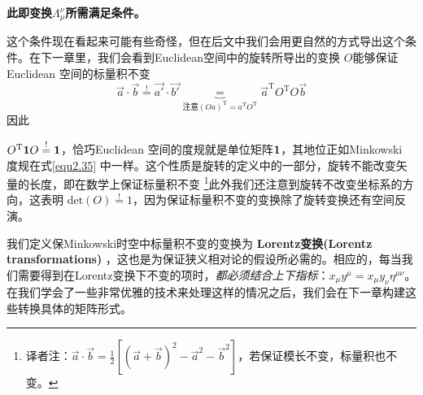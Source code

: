 {\bf{此即变换$\Lambda_\mu^\nu$所需满足条件。}}

这个条件现在看起来可能有些奇怪，但在后文中我们会用更自然的方式导出这个条件。在下一章里，我们会看到Euclidean空间中的旋转所导出的变换%
$O$能够保证Euclidean 空间的标量积不变%
\begin{equation}\label{equ2.36}
  \vec{a} \cdot \vec{b}
  \overset{\text{!}}{=}
  \vec{a'} \cdot \vec{b'}
  \!\!\!\!\!\!\!\!\!\!
  \underbrace{=}_{\text{注意}
  (Oa)^\mathrm{T}=a^\mathrm{T}O^\mathrm{T}}
  \!\!\!\!\!\!\!\!\!\!
  \vec{a}^\mathrm{T} O^\mathrm{T} O\vec{b}
\end{equation}
因此

$O^\mathrm{T} {\bf{1}} O\overset{\text{!}}{=}{\bf{1}}$，恰巧Euclidean 空间的度规就是单位矩阵${\bf{1}}$，其地位正如Minkowski 度规在式\eqref{equ2.35} 中一样。这个性质是旋转的定义中的一部分，旋转不能改变矢量的长度，即在数学上保证标量积不变
\footnote{译者注：$\vec{a}\cdot \vec{b}=\frac{1}{2} [(\vec{a}+\vec{b})^2-\vec{a}^2-\vec{b}^2]$，若保证模长不变，标量积也不变。}此外我们还注意到旋转不改变坐标系的方向，这表明 $\text{det}(O) \overset{\text{!}}{=}1$，因为保证标量积不变的变换除了旋转变换还有空间反演。

我们定义保Minkowski时空中标量积不变的变换为
{\bf{Lorentz变换(Lorentz transformations)}}
，这也是为保证狭义相对论的假设所必需的。相应的，每当我们需要得到在Lorentz变换下不变的项时，{\it{都必须结合上下指标}}：$x_\mu y^\mu=x_\mu y_\nu \eta^{\mu\nu}$。
在我们学会了一些非常优雅的技术来处理这样的情况之后，我们会在下一章构建这些转换具体的矩阵形式。
